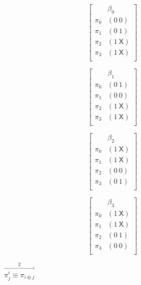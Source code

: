 \begin{enumerate}
\begin{figure}[h]
\parbox{0.2\textwidth}{
$$ \left[
  \begin{array}{c|c}
          & \beta_0 \\ \hline
    \pi_0 & (0~0) \\
    \pi_1 & (0~1) \\
    \pi_2 & (1~\textsf{X}) \\
    \pi_3 & (1~\textsf{X}) \\
  \end{array}
\right]
$$
}\parbox{0.2\textwidth}{
$$ \left[
  \begin{array}{c|c}
          & \beta_1 \\ \hline
    \pi_0 & (0~1) \\
    \pi_1 & (0~0) \\
    \pi_2 & (1~\textsf{X}) \\
    \pi_3 & (1~\textsf{X}) \\
  \end{array}
\right]
$$
}\parbox{0.2\textwidth}{
$$ \left[
  \begin{array}{c|c}
          & \beta_2 \\ \hline
    \pi_0 & (1~\textsf{X}) \\
    \pi_1 & (1~\textsf{X}) \\
    \pi_2 & (0~0) \\
    \pi_3 & (0~1) \\
  \end{array}
\right]
$$
}\parbox{0.2\textwidth}{
$$ \left[
  \begin{array}{c|c}
          & \beta_3 \\ \hline
    \pi_0 & (1~\textsf{X}) \\
    \pi_1 & (1~\textsf{X}) \\
    \pi_2 & (0~1) \\
    \pi_3 & (0~0) \\
  \end{array}
\right]
$$
} $\stackrel{2}{\stackrel{\longrightarrow}{\pi^i_j \equiv \pi_{i
\oplus j}}}$


\end{figure}
\end{enumerate}
